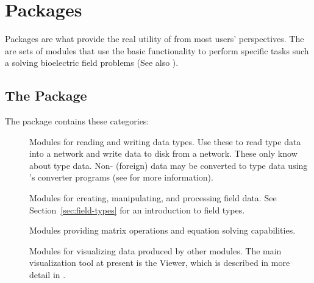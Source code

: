 %
%
%
%
%
%

\section{Packages}
\label{sec:packages}

Packages are what provide the real utility of \SR{} from most users'
perspectives.  The are sets of modules that use the basic \SR{}
functionality to perform specific tasks such a solving bioelectric
field problems (See also ).

\subsection{The \sr{} Package}
\label{sec:srpackage}

The \sr{} package contains these categories:

\begin{description}
\item[] Modules for reading and writing \sr{} data
  types.  Use these to read \sr{} type data into a network and write
  data to disk from a network.  These only know about \sr{} type data.
  Non-\sr{} (foreign) data may be converted to \sr{} type data using
  \sr{}'s converter programs (see  for more information).
  
\item[] Modules for creating, manipulating, and
  processing field data.  See Section~\ref{sec:field-types} for an
  introduction to \sr{} field types.
  
\item[] Modules providing matrix operations and
  equation solving capabilities.
  
\item[] Modules for visualizing data produced by
  other modules.  The main visualization tool at present
  is the Viewer, which is described in more detail in
  .
\end{description}

